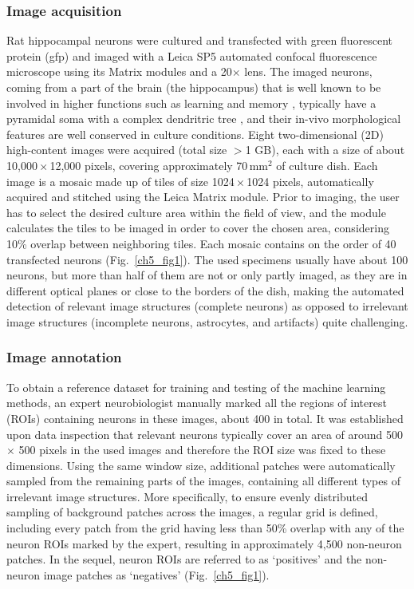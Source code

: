 \subsubsection{Image acquisition}
\label{sec:acquisition}
Rat hippocampal neurons were cultured and transfected with green fluorescent protein (\gls{gfp}) and imaged with a Leica SP5 automated confocal fluorescence microscope using its Matrix modules and a 20$\times$ lens. The imaged neurons, coming from a part of the brain (the hippocampus) that is well known to be involved in higher functions such as learning and memory \cite{squire1992memory}, typically have a pyramidal soma with a complex dendritric tree \cite{goslin1998rat}, and their in-vivo morphological features are well conserved in culture conditions. Eight two-dimensional (2D) high-content images were acquired (total size $>$1 GB), each with a size of about 10,000\,$\times$\,12,000 pixels, covering approximately 70\,mm${}^2$ of culture dish. Each image is a mosaic made up of tiles of size 1024\,$\times$\,1024 pixels, automatically acquired and stitched using the Leica Matrix module. Prior to imaging, the user has to select the desired culture area within the field of view, and the module calculates the tiles to be imaged in order to cover the chosen area, considering 10\% overlap between neighboring tiles. Each mosaic contains on the order of 40 transfected neurons (Fig.\ \ref{ch5_fig1}). The used specimens usually have about 100 neurons, but more than half of them are not or only partly imaged, as they are in different optical planes or close to the borders of the dish, making the automated detection of relevant image structures (complete neurons) as opposed to irrelevant image structures (incomplete neurons, astrocytes, and artifacts) quite challenging.

\subsubsection{Image annotation}
\label{sec:annotation}
To obtain a reference dataset for training and testing of the machine learning methods, an expert neurobiologist manually marked all the regions of interest (ROIs) containing neurons in these images, about 400 in total. It was established upon data inspection that relevant neurons typically cover an area of around 500 $\times$ 500 pixels in the used images and therefore the ROI size was fixed to these dimensions. Using the same window size, additional patches were automatically sampled from the remaining parts of the images, containing all different types of irrelevant image structures. More specifically, to ensure evenly distributed sampling of background patches across the images, a regular grid is defined, including every patch from the grid having less than 50\% overlap with any of the neuron ROIs marked by the expert, resulting in approximately 4,500 non-neuron patches. In the sequel, neuron ROIs are referred to as `positives' and the non-neuron image patches as `negatives' (Fig.~\ref{ch5_fig1}).

